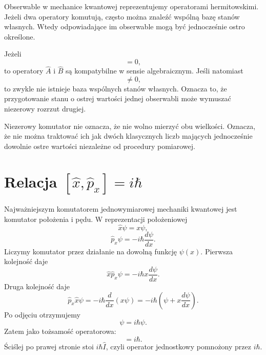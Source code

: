 Obserwable w mechanice kwantowej reprezentujemy operatorami hermitowskimi. Jeżeli dwa operatory komutują, często można znaleźć wspólną bazę stanów własnych. Wtedy odpowiadające im obserwable mogą być jednocześnie ostro określone.

Jeżeli
\begin{equation}
    [\hat{A},\hat{B}]=0,
\end{equation}
to operatory \(\hat{A}\) i \(\hat{B}\) są kompatybilne w sensie algebraicznym. Jeśli natomiast
\begin{equation}
    [\hat{A},\hat{B}]\neq 0,
\end{equation}
to zwykle nie istnieje baza wspólnych stanów własnych. Oznacza to, że przygotowanie stanu o ostrej wartości jednej obserwabli może wymuszać niezerowy rozrzut drugiej.

\begin{remarkbox}
Niezerowy komutator nie oznacza, że nie wolno mierzyć obu wielkości. Oznacza, że nie można traktować ich jak dwóch klasycznych liczb mających jednocześnie dowolnie ostre wartości niezależne od procedury pomiarowej.
\end{remarkbox}

\section{Relacja \texorpdfstring{\([\hat{x},\hat{p}_x]=i\hbar\)}{[x,px]=i hbar}}

Najważniejszym komutatorem jednowymiarowej mechaniki kwantowej jest komutator położenia i pędu. W reprezentacji położeniowej
\begin{equation}
    \hat{x}\psi=x\psi,
\end{equation}
\begin{equation}
    \hat{p}_x\psi=-i\hbar\frac{d\psi}{dx}.
\end{equation}
Liczymy komutator przez działanie na dowolną funkcję \(\psi(x)\). Pierwsza kolejność daje
\begin{equation}
    \hat{x}\hat{p}_x\psi=-i\hbar x\frac{d\psi}{dx}.
\end{equation}
Druga kolejność daje
\begin{equation}
    \hat{p}_x\hat{x}\psi
    =-i\hbar\frac{d}{dx}(x\psi)
    =-i\hbar\left(\psi+x\frac{d\psi}{dx}\right).
\end{equation}
Po odjęciu otrzymujemy
\begin{equation}
    [\hat{x},\hat{p}_x]\psi=i\hbar\psi.
\end{equation}
Zatem jako tożsamość operatorowa:
\begin{equation}
    [\hat{x},\hat{p}_x]=i\hbar.
\end{equation}
Ściślej po prawej stronie stoi \(i\hbar\hat{I}\), czyli operator jednostkowy pomnożony przez \(i\hbar\).

